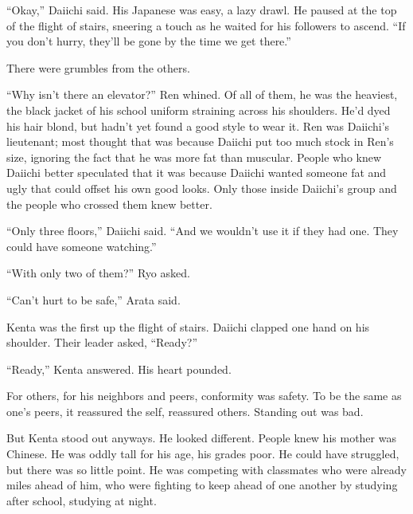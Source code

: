 








``Okay,'' Daiichi said.  His Japanese was easy, a lazy drawl.  He paused at the top of the flight of stairs, sneering a touch as he waited for his followers to ascend.  ``If you don't hurry, they'll be gone by the time we get there.''



There were grumbles from the others.



``Why isn't there an elevator?'' Ren whined.  Of all of them, he was the heaviest, the black jacket of his school uniform straining across his shoulders.  He'd dyed his hair blond, but hadn't yet found a good style to wear it.  Ren was Daiichi's lieutenant; most thought that was because Daiichi put too much stock in Ren's size, ignoring the fact that he was more fat than muscular.  People who knew Daiichi better speculated that it was because Daiichi wanted someone fat and ugly that could offset his own good looks.  Only those inside Daiichi's group and the people who crossed them knew better.



``Only three floors,'' Daiichi said.  ``And we wouldn't use it if they had one.  They could have someone watching.''



``With only two of them?''  Ryo asked.



``Can't hurt to be safe,'' Arata said.



Kenta was the first up the flight of stairs.  Daiichi clapped one hand on his shoulder.  Their leader asked, ``Ready?''



``Ready,'' Kenta answered.  His heart pounded.



For others, for his neighbors and peers, conformity was safety.  To be the same as one's peers, it reassured the self, reassured others.  Standing out was bad.



But Kenta stood out anyways.  He looked different.  People knew his mother was Chinese.  He was oddly tall for his age, his grades poor.  He could have struggled, but there was so little point.  He was competing with classmates who were already miles ahead of him, who were fighting to keep ahead of one another by studying after school, studying at night.



